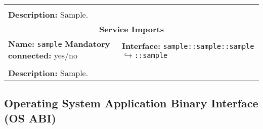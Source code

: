 \begin{center}
\begin{tabular}{|p{7.5cm}|p{7.5cm}|}
		\multicolumn{2}{|l|}{}\\
		\multicolumn{2}{|p{15cm}|}{\textbf{Description:} \newline Sample.}\\
		\hline
		\hline
		\multicolumn{2}{|c|}{\textbf{\large Service Imports}}\\
		\hline
		\multicolumn{1}{|p{7.5cm}}{\textbf{Name:} \texttt{sample} \newline \textbf{Mandatory connected:} yes/no} & \multicolumn{1}{p{7.5cm}|}{\textbf{Interface:} \newline \texttt{sample::sample::sample} \newline$\hookrightarrow$\texttt{::sample}}\\
		\multicolumn{2}{|l|}{}\\
		\multicolumn{2}{|p{15cm}|}{\textbf{Description:} \newline Sample.}\\
		\hline
	\end{tabular}
\end{center}

\subsection{Operating System Application Binary Interface (OS ABI)}

